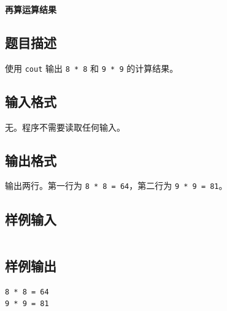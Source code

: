 \documentclass{article}
\newcommand{\problemname}[1]{\begin{center}\Large\bfseries #1\end{center}}
\begin{document}
\problemname{再算运算结果}

\subsection*{题目描述}
使用 \texttt{cout} 输出 \texttt{8 * 8} 和 \texttt{9 * 9} 的计算结果。

\subsection*{输入格式}
无。程序不需要读取任何输入。

\subsection*{输出格式}
输出两行。第一行为 \texttt{8 * 8 = 64}，第二行为 \texttt{9 * 9 = 81}。

\subsection*{样例输入}
\begin{verbatim}

\end{verbatim}

\subsection*{样例输出}
\begin{verbatim}
8 * 8 = 64
9 * 9 = 81
\end{verbatim}
\end{document}
